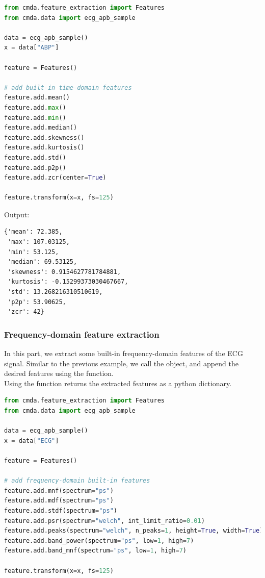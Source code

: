 \documentclass{article}
\begin{document}
\begin{lstlisting}[language=Python, caption=Time-domain feature extraction]
from cmda.feature_extraction import Features
from cmda.data import ecg_apb_sample

data = ecg_apb_sample()
x = data["ABP"]

feature = Features()

# add built-in time-domain features
feature.add.mean()
feature.add.max()
feature.add.min()
feature.add.median()
feature.add.skewness()
feature.add.kurtosis()
feature.add.std()
feature.add.p2p()
feature.add.zcr(center=True)

feature.transform(x=x, fs=125)
\end{lstlisting}

Output:
\begin{lstlisting}[caption=Time-domain feature extraction output]
{'mean': 72.385,
 'max': 107.03125,
 'min': 53.125,
 'median': 69.53125,
 'skewness': 0.9154627781784881,
 'kurtosis': -0.15299373030467667,
 'std': 13.268216310510619,
 'p2p': 53.90625,
 'zcr': 42}
\end{lstlisting}

\subsubsection{Frequency-domain feature extraction}
In this part, we extract some built-in frequency-domain features of the ECG signal. Similar to the previous example, we call the  object, and append the desired features using the  function.\\
Using the  function returns the extracted features as a python dictionary.
\begin{lstlisting}[language=Python, caption=Frequency-domain feature extraction]
from cmda.feature_extraction import Features
from cmda.data import ecg_apb_sample

data = ecg_apb_sample()
x = data["ECG"]

feature = Features()

# add frequency-domain built-in features
feature.add.mnf(spectrum="ps")
feature.add.mdf(spectrum="ps")
feature.add.stdf(spectrum="ps")
feature.add.psr(spectrum="welch", int_limit_ratio=0.01)
feature.add.peaks(spectrum="welch", n_peaks=1, height=True, width=True)
feature.add.band_power(spectrum="ps", low=1, high=7)
feature.add.band_mnf(spectrum="ps", low=1, high=7)

feature.transform(x=x, fs=125)
\end{lstlisting}
\end{document}
